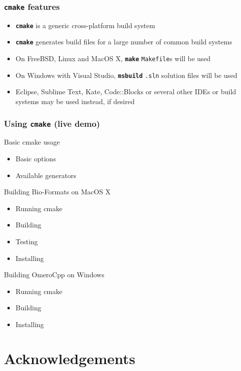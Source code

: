 \documentclass{beamer}
\newcommand{\cmd}[1]{\textbf{\texttt{#1}}}
\begin{document}
\begin{frame}
  \frametitle{\cmd{cmake} features}

  \begin{itemize}
  \item \cmd{cmake} is a generic cross-platform build system
  \item \cmd{cmake} generates build files for a large number of common
    build systems
  \item On FreeBSD, Linux and MacOS X, \cmd{make} \texttt{Makefile}s will be used
  \item On Windows with Visual Studio, \cmd{msbuild} \texttt{.sln}
    solution files will be used
  \item Eclipse, Sublime Text, Kate, Code::Blocks or several other
    IDEs or build systems may be used instead, if desired
  \end{itemize}
\end{frame}

\begin{frame}
  \frametitle{Using \cmd{cmake} (live demo)}
  \scriptsize
  \begin{block}{Basic cmake usage}
    \begin{itemize}
      \item Basic options
      \item Available generators
    \end{itemize}
  \end{block}
  \begin{block}{Building Bio-Formats on MacOS X}
    \begin{itemize}
      \item Running cmake
      \item Building
      \item Testing
      \item Installing
    \end{itemize}
  \end{block}
  \begin{block}{Building OmeroCpp on Windows}
    \begin{itemize}
      \item Running cmake
      \item Building
      \item Installing
    \end{itemize}
  \end{block}
\end{frame}

\section[]{Acknowledgements}
\end{document}
